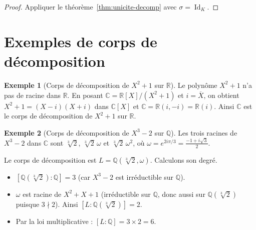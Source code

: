 \documentclass[12pt,a4paper,openany]{book}
\theoremstyle{definition}
\newtheorem{exemple}{Exemple}[chapter]
\newcommand{\Q}{\mathbb{Q}}
\newcommand{\R}{\mathbb{R}}
\newcommand{\C}{\mathbb{C}}
\newcommand{\Id}{\operatorname{Id}}
\begin{document}
\begin{proof}
Appliquer le théorème~\ref{thm:unicite-decomp} avec $\sigma = \Id_K$.
\end{proof}

\section{Exemples de corps de décomposition}
\label{sec:exemples-decomp}

\begin{exemple}[Corps de décomposition de $X^2 + 1$ sur $\R$]\label{ex:decomp-X2+1}
Le polynôme $X^2 + 1$ n'a pas de racine dans $\R$. En posant $\C = \R[X]/(X^2+1)$
et $i = \overline{X}$, on obtient $X^2 + 1 = (X - i)(X + i)$ dans $\C[X]$ et
$\C = \R(i, -i) = \R(i)$. Ainsi $\C$ est le corps de décomposition de $X^2+1$
sur $\R$.
\end{exemple}

\begin{exemple}[Corps de décomposition de $X^3 - 2$ sur $\Q$]\label{ex:decomp-X3-2}
Les trois racines de $X^3 - 2$ dans $\C$ sont $\sqrt[3]{2}$,
$\sqrt[3]{2}\,\omega$ et $\sqrt[3]{2}\,\omega^2$, où
$\omega = e^{2i\pi/3} = \frac{-1+i\sqrt{3}}{2}$.

Le corps de décomposition est $L = \Q(\sqrt[3]{2}, \omega)$. Calculons son degré.
\begin{itemize}
  \item $[\Q(\sqrt[3]{2}):\Q] = 3$ (car $X^3-2$ est irréductible sur $\Q$).
  \item $\omega$ est racine de $X^2 + X + 1$ (irréductible sur $\Q$, donc aussi
    sur $\Q(\sqrt[3]{2})$ puisque $3 \nmid 2$). Ainsi
    $[L:\Q(\sqrt[3]{2})] = 2$.
  \item Par la loi multiplicative : $[L:\Q] = 3 \times 2 = 6$.
\end{itemize}
\end{exemple}

\begin{center}
\end{center}
\end{document}
